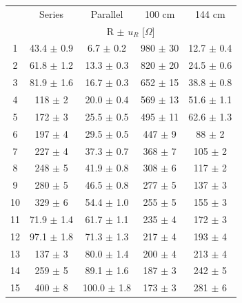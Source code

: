 \documentclass[a4paper]{article}
\begin{document}
\begin{table}[H]
	\centering
	\begin{tabular}{c|cccc}
		\hline
		   & Series                                       & Parallel        & 100 cm         & 144 cm         \\
		   & \multicolumn{4}{c}{R $\pm$ $u_R$ [$\Omega$]}                                                     \\
		\hline
		1  & 43.4 $\pm$ 0.9                               & 6.7 $\pm$ 0.2   & 980 $\pm$ 30   & 12.7 $\pm$ 0.4 \\
		2  & 61.8 $\pm$ 1.2                               & 13.3 $\pm$ 0.3  & 820 $\pm$ 20   & 24.5 $\pm$ 0.6 \\
		3  & 81.9 $\pm$ 1.6                               & 16.7 $\pm$ 0.3  & 652 $\pm$ 15   & 38.8 $\pm$ 0.8 \\
		4  & 118 $\pm$ 2                                  & 20.0 $\pm$ 0.4  & 569 $\pm$ 13   & 51.6 $\pm$ 1.1 \\
		5  & 172 $\pm$ 3                                  & 25.5 $\pm$ 0.5  & 495 $\pm$ 11   & 62.6 $\pm$ 1.3 \\
		6  & 197 $\pm$ 4                                  & 29.5 $\pm$ 0.5  & 447 $\pm$ 9    & 88 $\pm$ 2     \\
		7  & 227 $\pm$ 4                                  & 37.3 $\pm$ 0.7  & 368 $\pm$ 7    & 105 $\pm$ 2    \\
		8  & 248 $\pm$ 5                                  & 41.9 $\pm$ 0.8  & 308 $\pm$ 6    & 117 $\pm$ 2    \\
		9  & 280 $\pm$ 5                                  & 46.5 $\pm$ 0.8  & 277 $\pm$ 5    & 137 $\pm$ 3    \\
		10 & 329 $\pm$ 6                                  & 54.4 $\pm$ 1.0  & 255 $\pm$ 5    & 155 $\pm$ 3    \\
		11 & 71.9 $\pm$ 1.4                               & 61.7 $\pm$ 1.1  & 235 $\pm$ 4    & 172 $\pm$ 3    \\
		12 & 97.1 $\pm$ 1.8                               & 71.3 $\pm$ 1.3  & 217 $\pm$ 4    & 193 $\pm$ 4    \\
		13 & 137 $\pm$ 3                                  & 80.0 $\pm$ 1.4  & 200 $\pm$ 4    & 213 $\pm$ 4    \\
		14 & 259 $\pm$ 5                                  & 89.1 $\pm$ 1.6  & 187 $\pm$ 3    & 242 $\pm$ 5    \\
		15 & 400 $\pm$ 8                                  & 100.0 $\pm$ 1.8 & 173 $\pm$ 3    & 281 $\pm$ 6    \\

\end{tabular}
\end{table}
\end{document}
